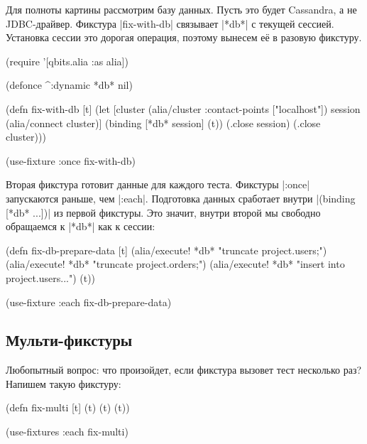 
Для полноты картины рассмотрим базу данных. Пусть это будет Cassandra, а не
JDBC-драйвер. Фикстура \spverb|fix-with-db| связывает \spverb|*db*| с текущей
сессией. Установка сессии это дорогая операция, поэтому вынесем её в разовую
фикстуру.

\begin{english}
  \begin{clojure}
(require '[qbits.alia :as alia])

(defonce ^:dynamic *db* nil)

(defn fix-with-db [t]
  (let [cluster (alia/cluster {:contact-points ["localhost"]})
        session (alia/connect cluster)]
    (binding [*db* session]
      (t))
    (.close session)
    (.close cluster)))

(use-fixture :once fix-with-db)
  \end{clojure}
\end{english}

Вторая фикстура готовит данные для каждого теста. Фикстуры \spverb|:once|
запускаются раньше, чем \spverb|:each|. Подготовка данных сработает внутри
\spverb|(binding [*db* ...])| из первой фикстуры. Это значит, внутри второй мы
свободно обращаемся к \spverb|*db*| как к сессии:


\begin{english}
  \begin{clojure}
(defn fix-db-prepare-data [t]
  (alia/execute! *db* "truncate project.users;")
  (alia/execute! *db* "truncate project.orders;")
  (alia/execute! *db* "insert into project.users...")
  (t))

(use-fixture :each fix-db-prepare-data)
  \end{clojure}
\end{english}

\subsection{Мульти-фикстуры}


Любопытный вопрос: что произойдет, если фикстура вызовет тест несколько раз?
Напишем такую фикстуру:

\begin{english}
  \begin{clojure}
(defn fix-multi [t]
  (t) (t) (t))

(use-fixtures :each fix-multi)
  \end{clojure}
\end{english}

